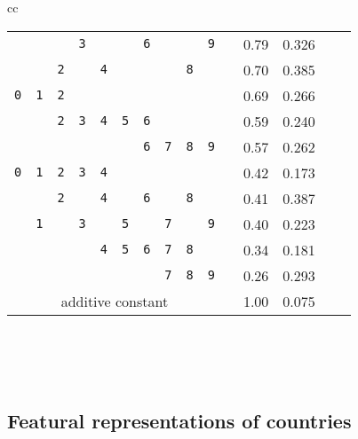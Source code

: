 \documentclass[11pt]{article}
\begin{document}
\begin{table}[t]
\begin{center}
\begin{tabular}{cc}
\begin{tabular}{ccccccccccccccc}
      \hline
  &  &  & \texttt{3}  &  &  & \texttt{6}  &  &  & \texttt{9}  & & 0.79 & 0.326\\
  &  & \texttt{2}  &  & \texttt{4}  &  &  &  & \texttt{8}  &  & & 0.70 & 0.385\\
 \texttt{0}  & \texttt{1}  & \texttt{2}  &  &  &  &  &  &  &  & & 0.69 & 0.266\\
  &  & \texttt{2}  & \texttt{3}  & \texttt{4}  & \texttt{5}  & \texttt{6}  &  &  &  & & 0.59 & 0.240\\
  &  &  &  &  &  & \texttt{6}  & \texttt{7}  & \texttt{8}  & \texttt{9}  & & 0.57 & 0.262\\
 \texttt{0}  & \texttt{1}  & \texttt{2}  & \texttt{3}  & \texttt{4}  &  &  &  &  &  & & 0.42 & 0.173\\
  &  & \texttt{2}  &  & \texttt{4}  &  & \texttt{6}  &  & \texttt{8}  &  & & 0.41 & 0.387\\
  & \texttt{1}  &  & \texttt{3}  &  & \texttt{5}  &  & \texttt{7}  &  & \texttt{9}  & & 0.40 & 0.223\\
  &  &  &  & \texttt{4}  & \texttt{5}  & \texttt{6}  & \texttt{7}  & \texttt{8}  &  & & 0.34 & 0.181\\
  &  &  &  &  &  &  & \texttt{7}  & \texttt{8}  & \texttt{9}  & & 0.26 & 0.293\\
      \multicolumn{10}{c}{additive constant} && 1.00 & 0.075\\
      \hline
    \end{tabular}
\\ \\ \\
  \end{tabular}
  \normalsize \end{center} \end{table}


\subsection{Featural representations of countries}
\end{document}

